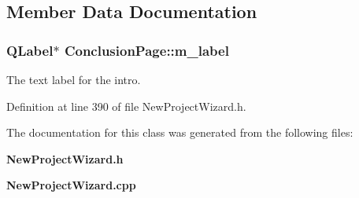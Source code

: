 \subsection{Member Data Documentation}
\subsubsection[{m\-\_\-label}]{\setlength{\rightskip}{0pt plus 5cm}Q\-Label$\ast$ Conclusion\-Page\-::m\-\_\-label\hspace{0.3cm}{\ttfamily [private]}}\label{class_conclusion_page_a620202ebfe08196b9f0b803562c81447}


The text label for the intro. 



Definition at line 390 of file New\-Project\-Wizard.\-h.



The documentation for this class was generated from the following files\-:\begin{DoxyCompactItemize}
\item 
{\bf New\-Project\-Wizard.\-h}\item 
{\bf New\-Project\-Wizard.\-cpp}\end{DoxyCompactItemize}
